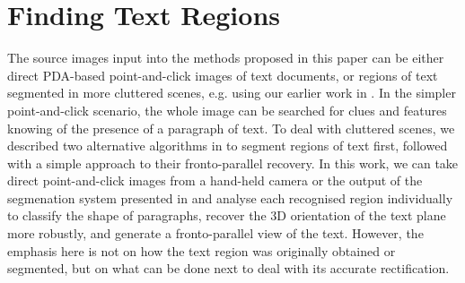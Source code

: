 \section{Finding Text Regions}   \label{recoveryusinglines}



The source images input into the methods proposed in this paper can be either
direct PDA-based point-and-click images of text documents, or regions of text
segmented in more cluttered scenes, e.g. using our earlier work in
\cite{clark-ijdar-2001}. In the simpler point-and-click scenario, 
the whole image can be searched for clues and features knowing of the presence
of a paragraph of text. To deal with cluttered scenes, we described two alternative
algorithms in \cite{clark-ijdar-2001} to segment regions of text first, followed
with a simple approach to their fronto-parallel recovery. In this work, we can
take direct point-and-click images from a hand-held camera or 
the output of the segmenation system presented in
\cite{clark-ijdar-2001} and analyse each recognised region individually to
classify the shape of paragraphs, recover the 3D orientation of the text plane
more robustly, and generate a fronto-parallel view of the text. However, the
emphasis here is not on how the text region was originally obtained or
segmented, but on what can be done next to deal with its accurate rectification.


